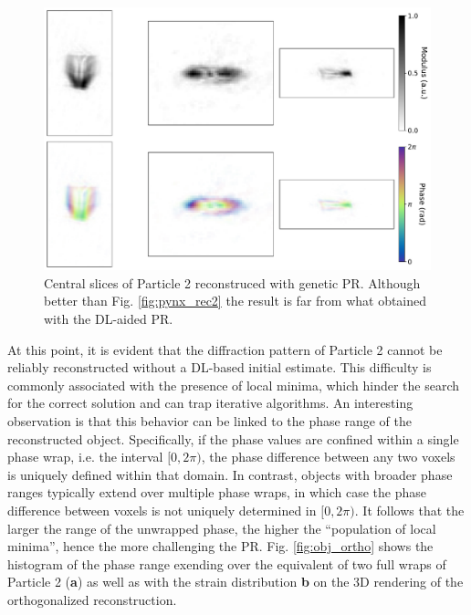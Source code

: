 \begin{figure}[H]
    \centering
    \includegraphics[width=\textwidth]{figures/Phasing/clement_genetic.pdf}
    \caption{Central slices of Particle 2 reconstruced with genetic PR. Although better than Fig. \ref{fig:pynx_rec2}
    the result is far from what obtained with the DL-aided PR. }
    \label{fig:clement_genetic}
\end{figure}

At this point, it is evident that the diffraction pattern of Particle 2 cannot be reliably reconstructed without a 
DL-based initial estimate. This difficulty is commonly associated with the presence of local minima, which hinder 
the search for the correct solution and can trap iterative algorithms. An interesting observation is that this behavior 
can be linked to the phase range of the reconstructed object. Specifically, if the phase values are confined within 
a single phase wrap, i.e. the interval $[0,2\pi)$, the phase difference between any two voxels is uniquely defined 
within that domain. In contrast, objects with broader phase ranges typically extend over multiple phase wraps, in which 
case the phase difference between voxels is not uniquely determined in $[0,2\pi)$. 
It follows that the larger the range of the unwrapped phase, the 
higher the ``population of local minima'', hence the more challenging the PR. Fig. \ref{fig:obj_ortho} shows the 
histogram of the phase range exending over the equivalent of two full wraps of Particle 2 (\textbf{a}) as well as 
with the strain distribution \textbf{b} on the 3D rendering of the orthogonalized reconstruction. 

